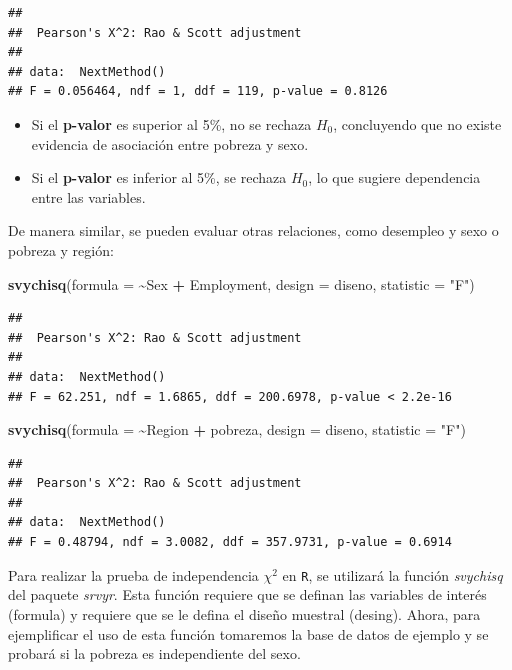 \documentclass[
  spanish,
  12pt,
]{book}
\newenvironment{Shaded}{\begin{snugshade}}{\end{snugshade}}
\newcommand{\AttributeTok}[1]{\textcolor[rgb]{0.13,0.29,0.53}{#1}}
\newcommand{\FunctionTok}[1]{\textcolor[rgb]{0.13,0.29,0.53}{\textbf{#1}}}
\newcommand{\NormalTok}[1]{#1}
\newcommand{\SpecialCharTok}[1]{\textcolor[rgb]{0.81,0.36,0.00}{\textbf{#1}}}
\newcommand{\StringTok}[1]{\textcolor[rgb]{0.31,0.60,0.02}{#1}}
\providecommand{\tightlist}{%
  \setlength{\itemsep}{0pt}\setlength{\parskip}{0pt}}
\begin{document}
\begin{verbatim}
## 
##  Pearson's X^2: Rao & Scott adjustment
## 
## data:  NextMethod()
## F = 0.056464, ndf = 1, ddf = 119, p-value = 0.8126
\end{verbatim}

\begin{itemize}
\tightlist
\item
  Si el \textbf{p-valor} es superior al 5\%, no se rechaza \(H_0\), concluyendo que no existe evidencia de asociación entre pobreza y sexo.
\item
  Si el \textbf{p-valor} es inferior al 5\%, se rechaza \(H_0\), lo que sugiere dependencia entre las variables.
\end{itemize}

De manera similar, se pueden evaluar otras relaciones, como desempleo y sexo o pobreza y región:

\begin{Shaded}
\begin{Highlighting}[]
\FunctionTok{svychisq}\NormalTok{(}\AttributeTok{formula =} \SpecialCharTok{\textasciitilde{}}\NormalTok{Sex }\SpecialCharTok{+}\NormalTok{ Employment, }\AttributeTok{design =}\NormalTok{ diseno, }\AttributeTok{statistic =} \StringTok{"F"}\NormalTok{)}
\end{Highlighting}
\end{Shaded}

\begin{verbatim}
## 
##  Pearson's X^2: Rao & Scott adjustment
## 
## data:  NextMethod()
## F = 62.251, ndf = 1.6865, ddf = 200.6978, p-value < 2.2e-16
\end{verbatim}

\begin{Shaded}
\begin{Highlighting}[]
\FunctionTok{svychisq}\NormalTok{(}\AttributeTok{formula =} \SpecialCharTok{\textasciitilde{}}\NormalTok{Region }\SpecialCharTok{+}\NormalTok{ pobreza, }\AttributeTok{design =}\NormalTok{ diseno, }\AttributeTok{statistic =} \StringTok{"F"}\NormalTok{)}
\end{Highlighting}
\end{Shaded}

\begin{verbatim}
## 
##  Pearson's X^2: Rao & Scott adjustment
## 
## data:  NextMethod()
## F = 0.48794, ndf = 3.0082, ddf = 357.9731, p-value = 0.6914
\end{verbatim}

Para realizar la prueba de independencia \(\chi^{2}\) en \texttt{R}, se utilizará la función \emph{svychisq} del paquete \emph{srvyr}. Esta función requiere que se definan las variables de interés (formula) y requiere que se le defina el diseño muestral (desing). Ahora, para ejemplificar el uso de esta función tomaremos la base de datos de ejemplo y se probará si la pobreza es independiente del sexo.
\end{document}
